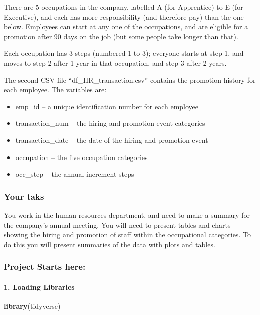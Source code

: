 \documentclass[
]{article}
\newenvironment{Shaded}{\begin{snugshade}}{\end{snugshade}}
\newcommand{\KeywordTok}[1]{\textcolor[rgb]{0.13,0.29,0.53}{\textbf{#1}}}
\newcommand{\NormalTok}[1]{#1}
\begin{document}
There are 5 occupations in the company, labelled A (for Apprentice) to E
(for Executive), and each has more responsibility (and therefore pay)
than the one below. Employees can start at any one of the occupations,
and are eligible for a promotion after 90 days on the job (but some
people take longer than that).

Each occupation has 3 steps (numbered 1 to 3); everyone starts at step
1, and moves to step 2 after 1 year in that occupation, and step 3 after
2 years.

The second CSV file ``df\_HR\_transaction.csv'' contains the promotion
history for each employee. The variables are:

\begin{itemize}
\item
  emp\_id -- a unique identification number for each employee
\item
  transaction\_num -- the hiring and promotion event categories
\item
  transaction\_date -- the date of the hiring and promotion event
\item
  occupation -- the five occupation categories
\item
  occ\_step -- the annual increment steps
\end{itemize}

\hypertarget{your-taks}{%
\subsubsection{Your taks}\label{your-taks}}

You work in the human resources department, and need to make a summary
for the company's annual meeting. You will need to present tables and
charts showing the hiring and promotion of staff within the occupational
categories. To do this you will present summaries of the data with plots
and tables.

\hypertarget{project-starts-here}{%
\subsubsection{Project Starts here:}\label{project-starts-here}}

\hypertarget{loading-libraries}{%
\paragraph{1. Loading Libraries}\label{loading-libraries}}

\begin{Shaded}
\begin{Highlighting}[]
\KeywordTok{library}\NormalTok{(tidyverse)}
\end{Highlighting}
\end{Shaded}
\end{document}
